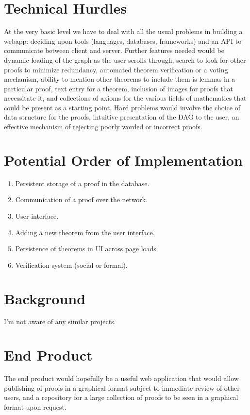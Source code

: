 \documentclass[letterpaper,twocolumn,10pt]{article}
\begin{document}
\section{Technical Hurdles}
At the very basic level we have to deal with all the usual problems in
building a webapp: deciding upon tools (languages, databases, frameworks)
and an API to communicate between client and server. Further features
needed would be dynamic loading of the graph as the user scrolls through,
search to look for other proofs to minimize redundancy, automated theorem
verification or a voting mechanism, ability to mention other theorems
to include them is lemmas in a particular proof, text entry for a theorem,
inclusion of images for proofs that necessitate it, and collections of
axioms for the various fields of mathematics that could be present as
a starting point. Hard problems would involve the choice of data 
structure for the proofs, intuitive presentation of the DAG to the user,
an effective mechanism of rejecting poorly worded or incorrect proofs.

\section{Potential Order of Implementation}
\begin{enumerate}
    \item Persistent storage of a proof in the database.
    \item Communication of a proof over the network.
    \item User interface.
    \item Adding a new theorem from the user interface.
    \item Persistence of theorems in UI across page loads.
    \item Verification system (social or formal). 
\end{enumerate}

\section{Background}
I'm not aware of any similar projects.
\section{End Product}
The end product would hopefully be a useful web application that would
allow publishing of proofs in a graphical format subject to immediate review
of other users, and a repository for a large collection of proofs to be
seen in a graphical format upon request.
\end{document}
